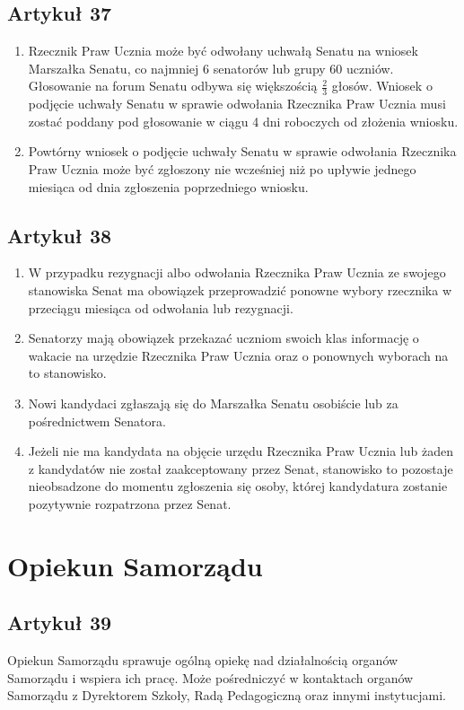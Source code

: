 \documentclass[14pt]{article}
\newenvironment{ustepy}{%
	\begin{enumerate}[leftmargin=1.5em, itemindent=1pt, labelwidth=1em, itemsep=5pt]
	}{%
	\end{enumerate}
}
\begin{document}
\subsection*{Artykuł 37}
\begin{ustepy}
	\item Rzecznik Praw Ucznia może być odwołany uchwałą Senatu na wniosek Marszałka Senatu, co najmniej 6 senatorów lub grupy 60 uczniów. Głosowanie na forum Senatu odbywa się większością \(\frac{2}{3}\) głosów. Wniosek o podjęcie uchwały Senatu w sprawie odwołania Rzecznika Praw Ucznia musi zostać poddany pod głosowanie w ciągu 4 dni roboczych od złożenia wniosku.
	\item Powtórny wniosek o podjęcie uchwały Senatu w sprawie odwołania Rzecznika Praw Ucznia może być zgłoszony nie wcześniej niż po upływie jednego miesiąca od dnia zgłoszenia poprzedniego wniosku.
\end{ustepy}
\subsection*{Artykuł 38}
\begin{ustepy}
	\item W przypadku rezygnacji albo odwołania Rzecznika Praw Ucznia ze swojego stanowiska Senat ma obowiązek przeprowadzić ponowne wybory rzecznika w przeciągu miesiąca od odwołania lub rezygnacji.
	\item Senatorzy mają obowiązek przekazać uczniom swoich klas informację o wakacie na urzędzie Rzecznika Praw Ucznia oraz o ponownych wyborach na to stanowisko.
	\item Nowi kandydaci zgłaszają się do Marszałka Senatu osobiście lub za pośrednictwem Senatora.
	\item Jeżeli nie ma kandydata na objęcie urzędu Rzecznika Praw Ucznia lub żaden z kandydatów nie został zaakceptowany przez Senat, stanowisko to pozostaje nieobsadzone do momentu zgłoszenia się osoby, której kandydatura zostanie pozytywnie rozpatrzona przez Senat.
\end{ustepy}
\newpage
\section{Opiekun Samorządu}
\subsection*{Artykuł 39}
Opiekun Samorządu sprawuje ogólną opiekę nad działalnością organów Samorządu i wspiera ich pracę. Może pośredniczyć w kontaktach organów Samorządu z Dyrektorem Szkoły, Radą Pedagogiczną oraz innymi instytucjami.
\end{document}
